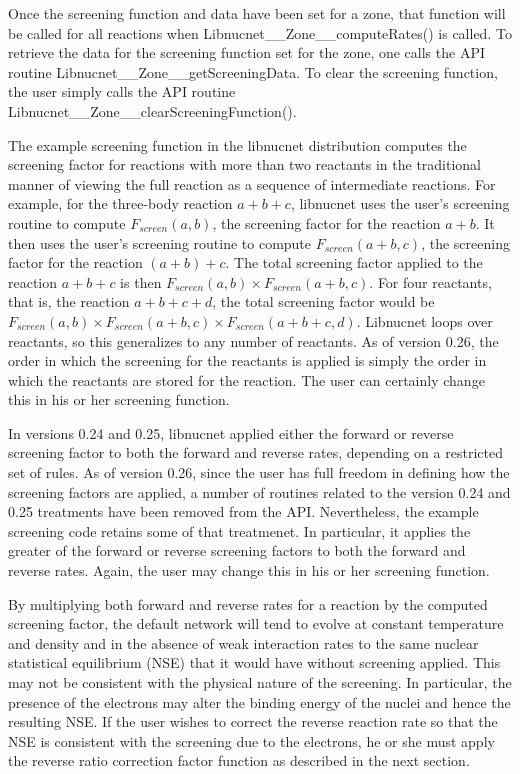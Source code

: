\documentclass{article}    %
\begin{document}
Once the screening function and data have been set for a zone, that function
will be called for all reactions when Libnucnet\_\_Zone\_\_computeRates()
is called.  To retrieve the data for the screening function set for the
zone, one calls the API routine Libnucnet\_\_Zone\_\_getScreeningData.
To clear the screening function, the user simply calls
the API routine Libnucnet\_\_Zone\_\_clearScreeningFunction().

The example screening function in the libnucnet distribution
computes the screening factor for reactions with more than two
reactants in the traditional manner of viewing the full reaction as a sequence
of intermediate reactions.  For example, for the three-body reaction
$a + b + c$, libnucnet uses the user's screening routine to compute
$F_{screen}(a,b)$, the screening factor for the reaction $a + b$.
It then uses the
user's screening routine to compute $F_{screen}(a+b,c)$,
the screening factor for
the reaction $(a + b) + c$.  The total screening factor applied to the
reaction $a + b + c$ is then $F_{screen}(a,b) \times F_{screen}(a+b,c)$.
For four reactants,
that is, the reaction $a + b + c + d$, the total screening factor would
be $F_{screen}(a,b) \times F_{screen}(a+b,c) \times F_{screen}(a+b+c,d)$.
Libnucnet loops over reactants,
so this generalizes to any number of reactants.
As of version 0.26, the order in which the screening for the reactants
is applied is simply the order in which the reactants are stored for the
reaction.  The user can certainly change this in his or her screening
function.

In versions 0.24 and 0.25, libnucnet applied either the forward or reverse
screening factor to both the forward and reverse rates, depending on
a restricted set of rules.  As of version 0.26, since the user has full
freedom in defining how the screening factors are applied, a number of
routines related to the version 0.24 and 0.25 treatments have been
removed from the API.  Nevertheless, the example screening code retains
some of that treatmenet.  In particular, it applies the greater of the
forward or reverse screening factors to both the forward and reverse
rates.  Again, the user may change this in his or her screening function.

By multiplying both forward and reverse rates for a reaction by the
computed screening factor,
the default network will tend to evolve at constant temperature and density and
in the absence of weak interaction rates to the same nuclear statistical
equilibrium (NSE) that it would have
without screening applied.  This may not be consistent with the physical
nature of the screening.  In particular, the presence of the electrons
may alter the binding energy of the nuclei and hence the resulting NSE.
If the user wishes to correct the reverse
reaction rate so that the NSE is consistent with the screening due to the
electrons, he or she must apply the reverse ratio correction factor
function as described in the next section.
\end{document}
